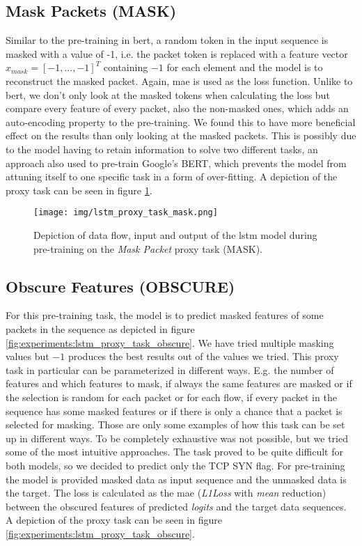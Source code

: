 \subsection{Mask Packets (MASK)} \label{sec:experiments:lstm:mask_packet}

Similar to the pre-training in \gls{bert}, a random token in the input sequence is masked with a value of -1, i.e. the packet token is replaced with a feature vector $x_{mask} = [-1, ..., -1]^T$ containing $-1$ for each element and the model is to reconstruct the masked packet. Again, \gls{mae} is used as the loss function. Unlike to \gls{bert}, we don't only look at the masked tokens when calculating the loss but compare every feature of every packet, also the non-masked ones, which adds an auto-encoding property to the pre-training. We found this to have more beneficial effect on the results than only looking at the masked packets. This is possibly due to the model having to retain information to solve two different tasks, an approach also used to pre-train Google's BERT,  which prevents the model from attuning itself to one specific task in a form of over-fitting. A depiction of the proxy task can be seen in figure \ref{fig:experiments:lstm_proxy_task_mask}.

\begin{figure}[h]
	\centering
	\texttt{[image: img/lstm\_proxy\_task\_mask.png]}
	\caption{Depiction of data flow, input and output of the \gls{lstm} model during pre-training on the \textit{Mask Packet} proxy task (MASK). }
	\label{fig:experiments:lstm_proxy_task_mask}
\end{figure}

\subsection{Obscure Features (OBSCURE)} \label{sec:experiments:lstm:obscure}

For this pre-training task, the model is to predict masked features of some packets in the sequence as depicted in figure \ref{fig:experiments:lstm_proxy_task_obscure}. We have tried multiple masking values but $-1$ produces the best results out of the values we tried. This proxy task in particular can be parameterized in different ways. E.g. the number of features and which features to mask, if always the same features are masked or if the selection is random for each packet or for each flow, if every packet in the sequence has some masked features or if there is only a chance that a packet is selected for masking. Those are only some examples of how this task can be set up in different ways. To be completely exhaustive was not possible, but we tried some of the most intuitive approaches. The task proved to be quite difficult for both models, so we decided to predict only the TCP SYN flag. For pre-training the model is provided masked data as input sequence and the unmasked data is the target. The loss is calculated as the \gls{mae} (\textit{L1Loss} with \textit{mean} reduction) between the obscured features of predicted \textit{logits} and the target data sequences. A depiction of the proxy task can be seen in figure \ref{fig:experiments:lstm_proxy_task_obscure}.

